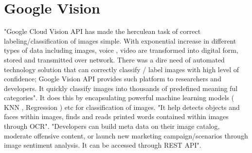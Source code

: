 \section{Google Vision}


"Google Cloud Vision API has made the herculean task of correct labeling/classification of images simple. With exponential increase 
in different types of data including images, voice , video are transformed into digital form, stored and transmitted over network. 
There was a dire need of automated technology solution that can correctly classify / label images with high level of confidence; 
Google Vision API provides such platform to researchers and developers. It quickly classify images into thousands of predefined 
meaning ful categories"\cite{www-google-vision}. It does this by encapsulating powerful machine learning models ( KNN , Regression ) 
etc for classification of images. 
"It help detects objects and faces within images, finds and reads printed words contained within images through 
OCR"\cite{www-google-vision}. "Developers can build meta data on their image catalog, moderate offensive content, or launch 
new marketing campaign/scenarios through image sentiment analysis. It can be accessed through REST API"\cite{www-google-vision}.

